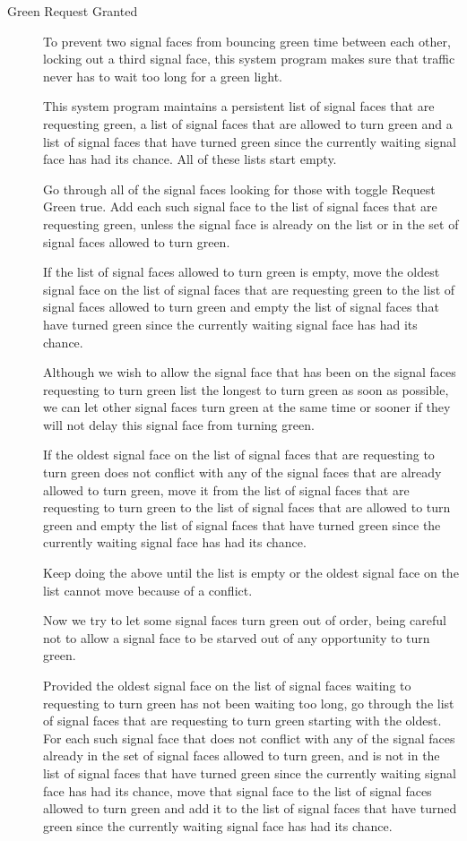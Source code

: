 \documentclass[letterpaper,twoside]{article}
\begin{document}
\begin{description}
\item [Green Request Granted]

To prevent two signal faces from bouncing green time between each other,
locking out a third signal face, this system program makes sure that
traffic never has to wait too long for a green light.

This system program maintains a persistent list of signal faces that are
requesting green,
a list of signal faces that are allowed to turn green and a list of signal
faces that have turned green since the currently waiting signal face
has had its chance.
All of these lists start empty.

Go through all of the signal faces looking for those with toggle Request
Green true.  Add each such signal face to the list of
signal faces that are requesting green, unless the signal face is already on
the list or in the set of signal faces allowed to turn green.

If the list of signal faces allowed to turn green is empty, move the
oldest signal face on the list of signal faces that are requesting
green to the list of signal faces allowed to turn green and empty the list
of signal faces that have turned green since the currently waiting
signal face has had its chance.

Although we wish to allow the signal face that has been on the
signal faces requesting to turn green list the longest to turn green
as soon as possible, we can let other signal faces turn green
at the same time or sooner if they will not delay this signal face
from turning green.

If the oldest signal face on the list of signal faces that are
requesting to turn green does not conflict with any of the signal
faces that are already allowed to turn green, move it from the
list of signal faces that are requesting to turn green to the list
of signal faces that are allowed to turn green and empty the list
of signal faces that have turned green since the currently waiting
signal face has had its chance.

Keep doing the above until the list is empty or the oldest signal
face on the list cannot move because of a conflict.

Now we try to let some signal faces turn green out of order, being
careful not to allow a signal face to be starved out of any
opportunity to turn green.

Provided the oldest signal face on the list of signal faces
waiting to requesting to turn green has not been waiting too long,
go through the list of signal faces that are requesting to turn green
starting with the oldest.  For each such signal face that does not
conflict with any of the signal faces already in the set of signal
faces allowed to turn green, and is not in the list of signal faces
that have turned green since the currently waiting signal face has
had its chance, move that signal face to the list of signal faces
allowed to turn green and add it to the list of signal faces that have
turned green since the currently waiting signal face has had its
chance.


\end{description}
\end{document}

